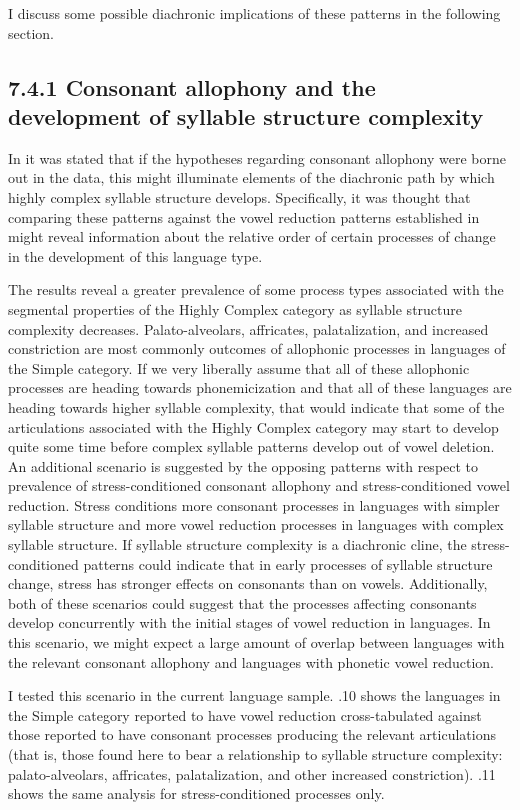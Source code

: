   I discuss some possible diachronic implications of these patterns in the following section.

\subsection{7.4.1 Consonant allophony and the development of syllable structure complexity} 

  In  it was stated that if the hypotheses regarding consonant allophony were borne out in the data, this might illuminate elements of the diachronic path by which highly complex syllable structure develops. Specifically, it was thought that comparing these patterns against the vowel reduction patterns established in  might reveal information about the relative order of certain processes of change in the development of this language type.

  The results reveal a greater prevalence of some process types associated with the segmental properties of the Highly Complex category as syllable structure complexity decreases. Palato-alveolars, affricates, palatalization, and increased constriction are most commonly outcomes of allophonic processes in languages of the Simple category. If we very liberally assume that all of these allophonic processes are heading towards phonemicization and that all of these languages are heading towards higher syllable complexity, that would indicate that some of the articulations associated with the Highly Complex category may start to develop quite some time before complex syllable patterns develop out of vowel deletion. An additional scenario is suggested by the opposing patterns with respect to prevalence of stress-conditioned consonant allophony and stress-conditioned vowel reduction. Stress conditions more consonant processes in languages with simpler syllable structure and more vowel reduction processes in languages with complex syllable structure. If syllable structure complexity is a diachronic cline, the stress-conditioned patterns could indicate that in early processes of syllable structure change, stress has stronger effects on consonants than on vowels. Additionally, both of these scenarios could suggest that the processes affecting consonants develop concurrently with the initial stages of vowel reduction in languages. In this scenario, we might expect a large amount of overlap between languages with the relevant consonant allophony and languages with phonetic vowel reduction.

  I tested this scenario in the current language sample. .10 shows the languages in the Simple category reported to have vowel reduction cross-tabulated against those reported to have consonant processes producing the relevant articulations (that is, those found here to bear a relationship to syllable structure complexity: palato-alveolars, affricates, palatalization, and other increased constriction). .11 shows the same analysis for stress-conditioned processes only.

